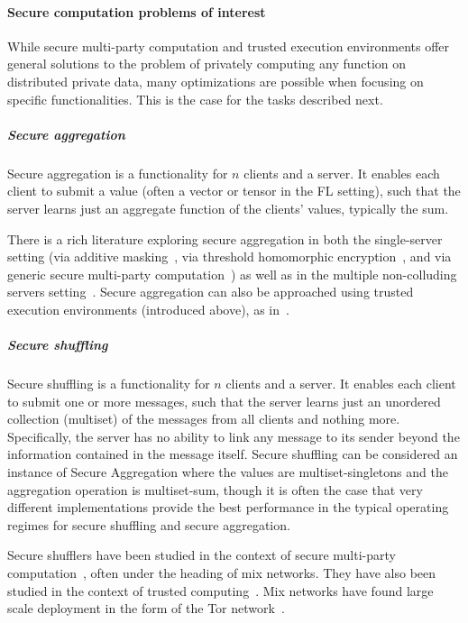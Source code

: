\documentclass[11pt]{article}
\begin{document}
\paragraph{Secure computation problems of interest}

While secure multi-party computation and trusted execution environments offer general solutions to the problem of privately computing any function on distributed private data, many optimizations are possible when focusing on specific functionalities. This is the case for the tasks described next.

\subparagraph{Secure aggregation}
Secure aggregation is a functionality for $n$ clients and a server.  It enables each client to submit a value (often a vector or tensor in the FL setting), such that the server learns just an aggregate function of the clients' values, typically the sum.  

There is a rich literature exploring secure aggregation in both the single-server setting (via additive masking~\cite{Acs:2011:IDD:2042445.2042457, DBLP:journals/tdsc/GoryczkaX17, bonawitz17secagg, bell20secagg,so2020turbo}, via threshold homomorphic encryption~\cite{shi2011privacy, halevi2011secure, chan2012privacy}, and via generic secure multi-party computation~\cite{burkhart2010sepia}) as well as in the multiple non-colluding servers setting~\cite{DBLP:conf/fc/BogetoftCDGJKNNNPST09, araki2016high, corrigan2017prio}.
Secure aggregation can also be approached using trusted execution environments (introduced above), as in~\cite{lie2017glimmers}.

\subparagraph{Secure shuffling}
Secure shuffling is a functionality for $n$ clients and a server.   It enables each client to submit one or more messages, such that the server learns just an unordered collection (multiset) of the messages from all clients and nothing more.  Specifically, the server has no ability to link any message to its sender beyond the information contained in the message itself.  
Secure shuffling can be considered an instance of Secure Aggregation where the values are multiset-singletons and the aggregation operation is multiset-sum, though it is often the case that very different implementations provide the best performance in the typical operating regimes for secure shuffling and secure aggregation.

Secure shufflers have been studied in the context of secure multi-party computation~\cite{chaum1981untraceable, kwon2016riffle}, often under the heading of mix networks.   They have also been studied in the context of trusted computing~\cite{prochlo}.  Mix networks have found large scale deployment in the form of the Tor network~\cite{dingledine2004tor}.  
\end{document}
